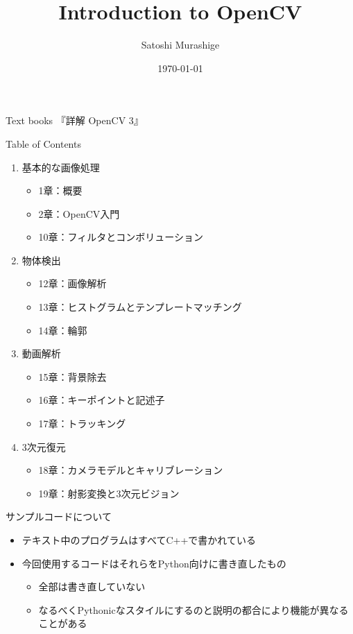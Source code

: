 \documentclass[10pt]{beamer}
\title{Introduction to OpenCV}
\date{\today}
\author{Satoshi Murashige}
\institute{Mathematical Informatics Lab., NAIST}
\newcommand{\myinsertlogo}[1]{%
\begin{tikzpicture}[overlay, remember picture]
    \node[above left=1cm and .8cm of current page.south east] {\texttt{[image: \#1]}};
\end{tikzpicture}}
\begin{document}
	\begin{frame}[plain]
		\maketitle
	\end{frame}
	\begin{frame}{Text books}
		『詳解 OpenCV 3』
	\end{frame}
	\begin{frame}{Table of Contents}
		\begin{enumerate}
			\item 基本的な画像処理
				\begin{itemize}
					\item 1章：概要
					\item 2章：OpenCV入門
					\item 10章：フィルタとコンボリューション
				\end{itemize}
			\item 物体検出
				\begin{itemize}
					\item 12章：画像解析
					\item 13章：ヒストグラムとテンプレートマッチング
					\item 14章：輪郭
				\end{itemize}
			\item 動画解析
				\begin{itemize}
					\item 15章：背景除去
					\item 16章：キーポイントと記述子
					\item 17章：トラッキング
				\end{itemize}
			\item 3次元復元
				\begin{itemize}
					\item 18章：カメラモデルとキャリブレーション
					\item 19章：射影変換と3次元ビジョン
				\end{itemize}
		\end{enumerate}
	\end{frame}

	\begin{frame}{サンプルコードについて}
		\begin{itemize}
			\item テキスト中のプログラムはすべてC++で書かれている
			\item 今回使用するコードはそれらをPython向けに書き直したもの
				\begin{itemize}
					\item 全部は書き直していない \Winkey[1.5]
					\item なるべくPythonicなスタイルにするのと説明の都合により機能が異なることがある
				\end{itemize}
		\end{itemize}
	\end{frame}
\end{document}
